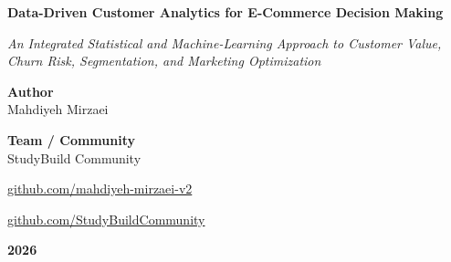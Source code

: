 \documentclass[11pt,a4paper]{article}
\begin{document}

\begin{titlepage}
\centering

\vspace*{1.5cm}

{\Large\bfseries Data-Driven Customer Analytics for E-Commerce Decision Making\par}

\vspace{0.7cm}

{\large\itshape An Integrated Statistical and Machine-Learning Approach to Customer Value, Churn Risk, Segmentation, and Marketing Optimization\par}

\vspace{1.8cm}


\vfill

{\large
\textbf{Author}\\[0.2cm]
Mahdiyeh Mirzaei
\par}

\vspace{0.5cm}

{\large
\textbf{Team / Community}\\[0.2cm]
StudyBuild Community
\par}

\vspace{0.5cm}

\href{https://github.com/mahdiyeh-mirzaei-v2}
{github.com/mahdiyeh-mirzaei-v2}

\vspace{0.15cm}

\href{https://github.com/StudyBuildCommunity}
{github.com/StudyBuildCommunity}

\vfill

{\large
\textbf{2026}
\par}

\end{titlepage}

\end{document}
